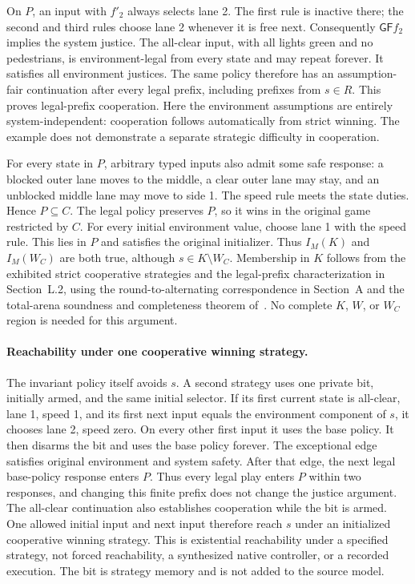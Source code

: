 On $P$, an input with $f'_2$ always selects lane 2. The first rule is
inactive there; the second and third rules choose lane 2 whenever it
is free next. Consequently $\mathsf{GF}f_2$ implies the system justice.
The all-clear input, with all lights green and no pedestrians, is
environment-legal from every state and may repeat forever. It satisfies
all environment justices. The same policy therefore has an
assumption-fair continuation after every legal prefix, including
prefixes from $s\in R$. This proves legal-prefix cooperation.
Here the environment assumptions are entirely system-independent:
cooperation follows automatically from strict winning. The example
does not demonstrate a separate strategic difficulty in cooperation.

For every state in $P$, arbitrary typed inputs also admit some safe
response: a blocked outer lane moves to the middle, a clear outer lane
may stay, and an unblocked middle lane may move to side 1. The speed
rule meets the state duties. Hence $P\subseteq C$. The legal policy
preserves $P$, so it wins in the original game restricted by $C$.
For every initial environment value, choose lane 1 with the speed
rule. This lies in $P$ and satisfies the original initializer.
Thus $I_M(K)$ and $I_M(W_C)$ are both true, although
$s\in K\setminus W_C$. Membership in $K$ follows from the exhibited
strict cooperative strategies and the legal-prefix characterization
in Section~L.2, using the round-to-alternating correspondence in
Section~A and the total-arena soundness and completeness theorem
of~\cite{friendly}.
No complete $K$, $W$, or $W_C$ region is needed for this argument.

\paragraph{Reachability under one cooperative winning strategy.}
The invariant policy itself avoids $s$. A second strategy uses one
private bit, initially armed, and the same initial selector. If its
first current state is all-clear, lane 1, speed 1, and its first next
input equals the environment component of $s$, it chooses lane 2,
speed zero. On every other first input it uses the base policy.
It then disarms the bit and uses the base policy forever.
The exceptional edge satisfies original environment and system safety.
After that edge, the next legal base-policy response enters $P$.
Thus every legal play enters $P$ within two responses, and changing
this finite prefix does not change the justice argument. The all-clear
continuation also establishes cooperation while the bit is armed.
One allowed initial input and next input therefore reach $s$ under
an initialized cooperative winning strategy. This is existential
reachability under a specified strategy, not forced reachability,
a synthesized native controller, or a recorded execution. The bit is
strategy memory and is not added to the source model.

